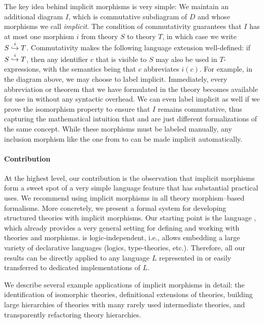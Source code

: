 The key idea behind implicit morphisms is very simple:
We maintain an additional diagram $I$, which is commutative subdiagram of $D$ and whose morphisms we call \emph{implicit}.
The condition of commutativity guarantees that $I$ has at most one morphism $i$ from theory $S$ to theory $T$, in which case we write $\ipc{i}{S}{T}$.
Commutativity makes the following language extension well-defined: if $\ipc{i}{S}{T}$, then any identifier $c$ that is visible to $S$ may also be used in $T$-expressions, with the semantics being that $c$ abbreviates $i(c)$.
For example, in the diagram above, we may choose to label  implicit.
Immediately, every abbreviation or theorem that we have formulated in the theory  becomes available for use in  without any syntactic overhead.
We can even label  implicit as well if we prove the isomorphism property to ensure that $I$ remains commutative, thus capturing the mathematical intuition that  and  are just different formalizations of the same concept.
While these morphisms must be labeled manually, any inclusion morphism like the one from  to  can be made implicit automatically.

\paragraph{Contribution}
At the highest level, our contribution is the observation that implicit morphisms form a sweet spot of a very simple language feature that has substantial practical uses.
We recommend using implicit morphisms in all theory morphism--based formalisms.
More concretely, we present a formal system for developing structured theories with implicit morphisms.
Our starting point is the \mmt language \cite{RK:mmt:10}, which already provides a very general setting for defining and working with theories and morphisms.
\mmt is logic-independent, i.e., allows embedding a large variety of declarative languages (logics, type-theories, etc.).
Therefore, all our results can be directly applied to any language $L$ represented in \mmt or easily transferred to dedicated implementations of $L$.

We describe several example applications of implicit morphisms in detail: the identification of isomorphic theories, definitional extensions of theories, building large hierarchies of theories with many rarely used intermediate theories, and transparently refactoring theory hierarchies.

